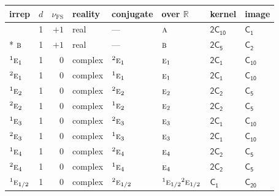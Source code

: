 \documentclass[10pt,a4paper]{article}
\makeatletter
\def\grouprule#1#2{\noalign{\marks\LTgroupmarks{\the\belowrulesep}\nobreak\vskip#1%
  \vskip\aboverulesep}\multispan\LT@cols\unskip{\leaders\hrule\@height#2\hfill\kern\z@}\cr
  \noalign{\penalty\LTrulebreak\vskip\belowrulesep\global\@lastruleclass\z@}}
\numberwithin{equation}{section}
\newcommand{\grp}[1]{\mathsf{#1}}
\newcommand{\irr}[1]{\text{\normalfont\scshape #1}}
\newcommand{\conjpair}[1]{{}^{#1}}
\newcommand{\detbox}[1]{{\setlength{\fboxsep}{1pt}\fbox{#1}}}
\newcommand{\fsind}{\nu_{\mathrm{FS}}}
\makeatother
\begin{document}
{\small\renewcommand{\arraystretch}{1.25}\setlength{\tabcolsep}{4pt}\begin{longtable}{@{}lrrlllll@{}}\toprule
irrep & $d$ & $\fsind$ & reality & conjugate & over $\mathbb{R}$ & kernel & image\\\midrule\endhead
\bottomrule\endfoot\endlastfoot
\detbox{$\irr{a}$} & 1 & $+1$ & real & --- & $\irr{a}$ & \href{2C10.pdf}{$\grp{2C_{10}}$} & \href{../../../rotation/data/pdf/C1.pdf}{$\grp{C_{1}}$}\\*
$\irr{b}$ & 1 & $+1$ & real & --- & $\irr{b}$ & \href{2C5.pdf}{$\grp{2C_{5}}$} & \href{../../../rotation/data/pdf/C2.pdf}{$\grp{C_{2}}$}\\
$\conjpair{1}\irr{e}_{1}$ & 1 & $0$ & complex & $\conjpair{2}\irr{e}_{1}$ & $\irr{e}_{1}$ & \href{2C1.pdf}{$\grp{2C_{1}}$} & \href{../../../rotation/data/pdf/C10.pdf}{$\grp{C_{10}}$}\\
$\conjpair{2}\irr{e}_{1}$ & 1 & $0$ & complex & $\conjpair{1}\irr{e}_{1}$ & $\irr{e}_{1}$ & \href{2C1.pdf}{$\grp{2C_{1}}$} & \href{../../../rotation/data/pdf/C10.pdf}{$\grp{C_{10}}$}\\
$\conjpair{1}\irr{e}_{2}$ & 1 & $0$ & complex & $\conjpair{2}\irr{e}_{2}$ & $\irr{e}_{2}$ & \href{2C2.pdf}{$\grp{2C_{2}}$} & \href{../../../rotation/data/pdf/C5.pdf}{$\grp{C_{5}}$}\\
$\conjpair{2}\irr{e}_{2}$ & 1 & $0$ & complex & $\conjpair{1}\irr{e}_{2}$ & $\irr{e}_{2}$ & \href{2C2.pdf}{$\grp{2C_{2}}$} & \href{../../../rotation/data/pdf/C5.pdf}{$\grp{C_{5}}$}\\
$\conjpair{1}\irr{e}_{3}$ & 1 & $0$ & complex & $\conjpair{2}\irr{e}_{3}$ & $\irr{e}_{3}$ & \href{2C1.pdf}{$\grp{2C_{1}}$} & \href{../../../rotation/data/pdf/C10.pdf}{$\grp{C_{10}}$}\\
$\conjpair{2}\irr{e}_{3}$ & 1 & $0$ & complex & $\conjpair{1}\irr{e}_{3}$ & $\irr{e}_{3}$ & \href{2C1.pdf}{$\grp{2C_{1}}$} & \href{../../../rotation/data/pdf/C10.pdf}{$\grp{C_{10}}$}\\
$\conjpair{1}\irr{e}_{4}$ & 1 & $0$ & complex & $\conjpair{2}\irr{e}_{4}$ & $\irr{e}_{4}$ & \href{2C2.pdf}{$\grp{2C_{2}}$} & \href{../../../rotation/data/pdf/C5.pdf}{$\grp{C_{5}}$}\\
$\conjpair{2}\irr{e}_{4}$ & 1 & $0$ & complex & $\conjpair{1}\irr{e}_{4}$ & $\irr{e}_{4}$ & \href{2C2.pdf}{$\grp{2C_{2}}$} & \href{../../../rotation/data/pdf/C5.pdf}{$\grp{C_{5}}$}\\
\grouprule{0pt}{\lightrulewidth}
$\conjpair{1}\irr{e}_{1/2}$ & 1 & $0$ & complex & $\conjpair{2}\irr{e}_{1/2}$ & $\conjpair{1}\irr{e}_{1/2}\conjpair{2}\irr{e}_{1/2}$ & \href{C1.pdf}{$\grp{C_{1}}$} & $\grp{C_{20}}$\\

\end{longtable}}
\end{document}
